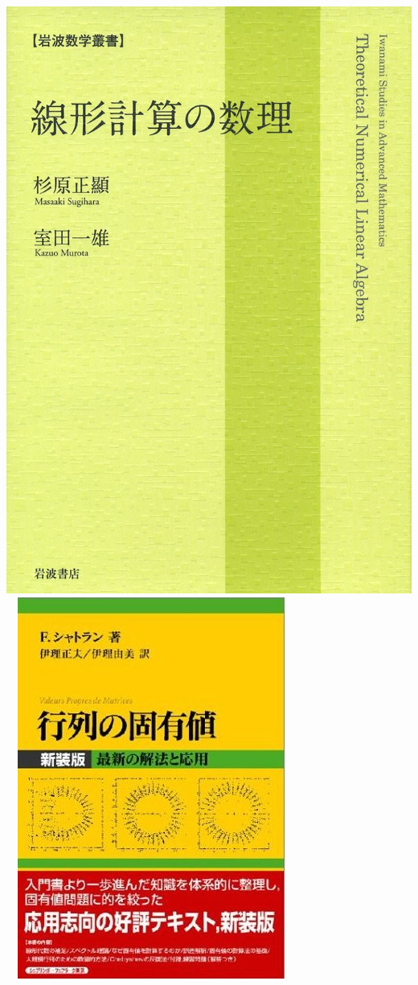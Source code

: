 \begin{frame}
\begin{center}
    \includegraphics[height=0.45\textheight]{figure/SenkeikeisanNoSuri.jpg}  \ \
    \includegraphics[height=0.45\textheight]{figure/GyoretsuNoKoyuchi.jpg}
  \end{center}
\end{frame}

